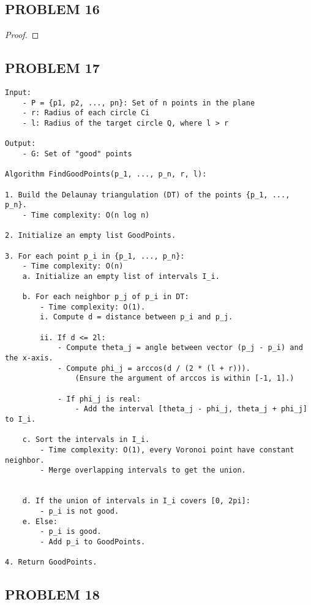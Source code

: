 \documentclass{article}
\begin{document}
\subsection*{PROBLEM 16}

\begin{proof}


\end{proof}

\subsection*{PROBLEM 17}

\begin{verbatim}
Input:
    - P = {p1, p2, ..., pn}: Set of n points in the plane
    - r: Radius of each circle Ci
    - l: Radius of the target circle Q, where l > r

Output:
    - G: Set of "good" points

Algorithm FindGoodPoints(p_1, ..., p_n, r, l):

1. Build the Delaunay triangulation (DT) of the points {p_1, ..., p_n}.
    - Time complexity: O(n log n)
    
2. Initialize an empty list GoodPoints.
    
3. For each point p_i in {p_1, ..., p_n}:
    - Time complexity: O(n)
    a. Initialize an empty list of intervals I_i.
    
    b. For each neighbor p_j of p_i in DT:
        - Time complexity: O(1).
        i. Compute d = distance between p_i and p_j.
    
        ii. If d <= 2l:
            - Compute theta_j = angle between vector (p_j - p_i) and the x-axis.
            - Compute phi_j = arccos(d / (2 * (l + r))).
                (Ensure the argument of arccos is within [-1, 1].)
    
            - If phi_j is real:
                - Add the interval [theta_j - phi_j, theta_j + phi_j] to I_i.
    
    c. Sort the intervals in I_i.
        - Time complexity: O(1), every Voronoi point have constant neighbor.
        - Merge overlapping intervals to get the union.
        
    
    d. If the union of intervals in I_i covers [0, 2pi]:
        - p_i is not good.
    e. Else:
        - p_i is good.
        - Add p_i to GoodPoints.
    
4. Return GoodPoints.
\end{verbatim}

\subsection*{PROBLEM 18}
\end{document}
